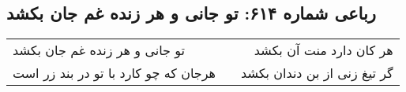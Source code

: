 \begin{center}
\section*{رباعی شماره ۶۱۴: تو جانی و هر زنده غم جان بکشد}
\label{sec:0614}
\begin{longtable}{l p{0.5cm} r}
تو جانی و هر زنده غم جان بکشد
&&
هر کان دارد منت آن بکشد
\\
هرجان که چو کارد با تو در بند زر است
&&
گر تیغ زنی از بن دندان بکشد
\\
\end{longtable}
\end{center}
